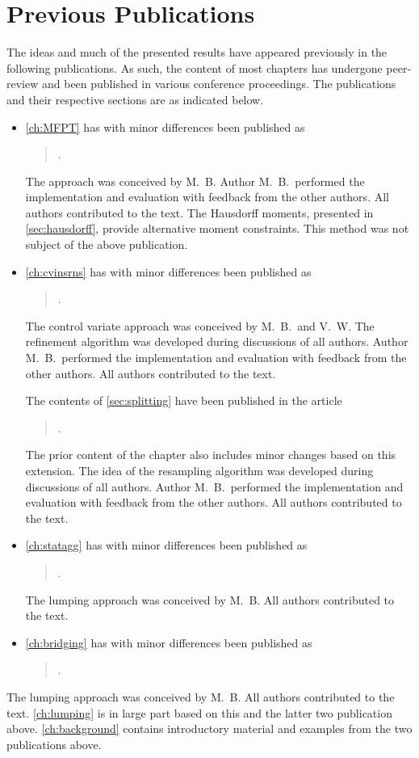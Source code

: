 \section{Previous Publications}%
The ideas and much of the presented results have appeared previously
in the following publications.
As such, the content of most chapters has undergone peer-review and
been published in various conference proceedings.
The publications and their respective sections are as indicated below.

\begin{itemize}

  \item \autoref{ch:MFPT} has with minor differences been published as
    \begin{quote}
      .
    \end{quote}
    The approach was conceived by M.\ B.
    Author M.\ B.\ performed the implementation and evaluation with
    feedback from the other authors.
    All authors contributed to the text.
    The Hausdorff moments, presented in \autoref{sec:hausdorff},
    provide alternative moment constraints.
    This method was not subject of the above publication.

  \item \autoref{ch:cvinsrns} has with minor differences been published as
    \begin{quote}
      .
    \end{quote}
    The control variate approach was conceived by M.\ B.\ and V.\ W.
    The refinement algorithm was developed during discussions of all authors.
    Author M.\ B.\ performed the implementation and evaluation with
    feedback from the other authors.
    All authors contributed to the text.

    The contents of \autoref{sec:splitting} have been published in the article
    \begin{quote}
      .
    \end{quote}
    The prior content of the chapter also includes minor changes
    based on this extension.
    The idea of the resampling algorithm was developed during
    discussions of all authors.
    Author M.\ B.\ performed the implementation and evaluation with
    feedback from the other authors.
    All authors contributed to the text.

  \item \autoref{ch:statagg} has with minor differences been published as
    \begin{quote}
      .
    \end{quote}
    The lumping approach was conceived by M.\ B.
    All authors contributed to the text.

  \item \autoref{ch:bridging} has with minor differences been published as
    \begin{quote}
      .
    \end{quote}
\end{itemize}
The lumping approach was conceived by M.\ B.
All authors contributed to the text.
\autoref{ch:lumping} is in large part based on this and the latter
two publication above.
\autoref{ch:background} contains introductory material and examples
from the two publications above.
